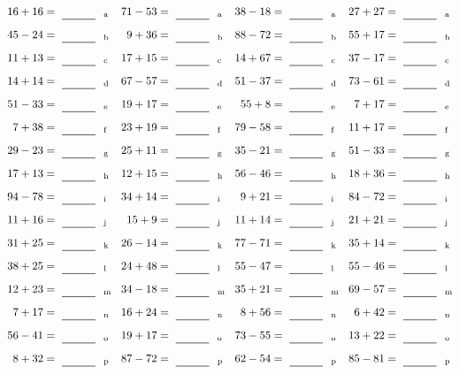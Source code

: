 \documentclass
[
  draft    = true,
  fontsize = 11pt,
  parskip  = half-
]
{scrartcl}
\begin{document}
\clearpage
\begin{align*}
    \pline{16+16}&=\rline{a}
  & \pline{71-53}&=\rline{a}
  & \pline{38-18}&=\rline{a}
  & \pline{27+27}&=\rline{a} \\[1ex]
    \pline{45-24}&=\rline{b}
  & \pline{9+36}&=\rline{b}
  & \pline{88-72}&=\rline{b}
  & \pline{55+17}&=\rline{b} \\[1ex]
    \pline{11+13}&=\rline{c}
  & \pline{17+15}&=\rline{c}
  & \pline{14+67}&=\rline{c}
  & \pline{37-17}&=\rline{c} \\[1ex]
    \pline{14+14}&=\rline{d}
  & \pline{67-57}&=\rline{d}
  & \pline{51-37}&=\rline{d}
  & \pline{73-61}&=\rline{d} \\[1ex]
    \pline{51-33}&=\rline{e}
  & \pline{19+17}&=\rline{e}
  & \pline{55+8}&=\rline{e}
  & \pline{7+17}&=\rline{e} \\[1ex]
    \pline{7+38}&=\rline{f}
  & \pline{23+19}&=\rline{f}
  & \pline{79-58}&=\rline{f}
  & \pline{11+17}&=\rline{f} \\[1ex]
    \pline{29-23}&=\rline{g}
  & \pline{25+11}&=\rline{g}
  & \pline{35-21}&=\rline{g}
  & \pline{51-33}&=\rline{g} \\[1ex]
    \pline{17+13}&=\rline{h}
  & \pline{12+15}&=\rline{h}
  & \pline{56-46}&=\rline{h}
  & \pline{18+36}&=\rline{h} \\[1ex]
    \pline{94-78}&=\rline{i}
  & \pline{34+14}&=\rline{i}
  & \pline{9+21}&=\rline{i}
  & \pline{84-72}&=\rline{i} \\[1ex]
    \pline{11+16}&=\rline{j}
  & \pline{15+9}&=\rline{j}
  & \pline{11+14}&=\rline{j}
  & \pline{21+21}&=\rline{j} \\[1ex]
    \pline{31+25}&=\rline{k}
  & \pline{26-14}&=\rline{k}
  & \pline{77-71}&=\rline{k}
  & \pline{35+14}&=\rline{k} \\[1ex]
    \pline{38+25}&=\rline{l}
  & \pline{24+48}&=\rline{l}
  & \pline{55-47}&=\rline{l}
  & \pline{55-46}&=\rline{l} \\[1ex]
    \pline{12+23}&=\rline{m}
  & \pline{34-18}&=\rline{m}
  & \pline{35+21}&=\rline{m}
  & \pline{69-57}&=\rline{m} \\[1ex]
    \pline{7+17}&=\rline{n}
  & \pline{16+24}&=\rline{n}
  & \pline{8+56}&=\rline{n}
  & \pline{6+42}&=\rline{n} \\[1ex]
    \pline{56-41}&=\rline{o}
  & \pline{19+17}&=\rline{o}
  & \pline{73-55}&=\rline{o}
  & \pline{13+22}&=\rline{o} \\[1ex]
    \pline{8+32}&=\rline{p}
  & \pline{87-72}&=\rline{p}
  & \pline{62-54}&=\rline{p}
  & \pline{85-81}&=\rline{p}
\end{align*}
\end{document}
